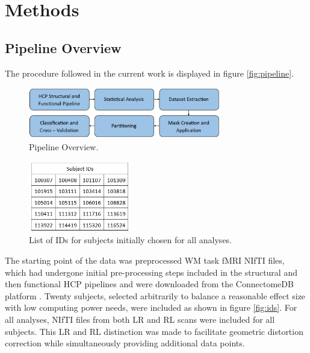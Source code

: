 \pagebreak
\chapter{Methods}
\label{sec:methods}

\section{Pipeline Overview}

The procedure followed in the current work is displayed in figure \autoref{fig:pipeline}.

\begin{figure}[htbp]
    \centering
    \includegraphics[width = 0.75\textwidth]{assets/images/pipeline.png}
    \caption[Pipeline Overview]{Pipeline Overview.}
    \label{fig:pipeline}
\end{figure}

\begin{figure}
    \centering
    \includegraphics[width = 0.4\textwidth]{assets/images/IDs.png}
    \caption[]{List of IDs for subjects initially chosen for all analyses.}
    \label{fig:ids}
\end{figure}

\addtocounter{table}{1}
\addtocounter{figure}{-1}

The starting point of the data was preprocessed \gls{WM} task \gls{fMRI} \gls{NIfTI} files, which had undergone initial pre-processing steps included in the structural and then functional \gls{HCP} pipelines \cite{Glasser2013} and were downloaded from the ConnectomeDB platform \cite{ConnectomeDB}. Twenty subjects, selected arbitrarily to balance a reasonable effect size with low computing power needs, were included as shown in figure \autoref{fig:ids}. For all analyses, \gls{NIfTI} files from both \gls{LR} and \gls{RL} scans were included for all subjects. This \gls{LR} and \gls{RL} distinction was made to facilitate geometric distortion correction while simultaneously providing additional data points.

